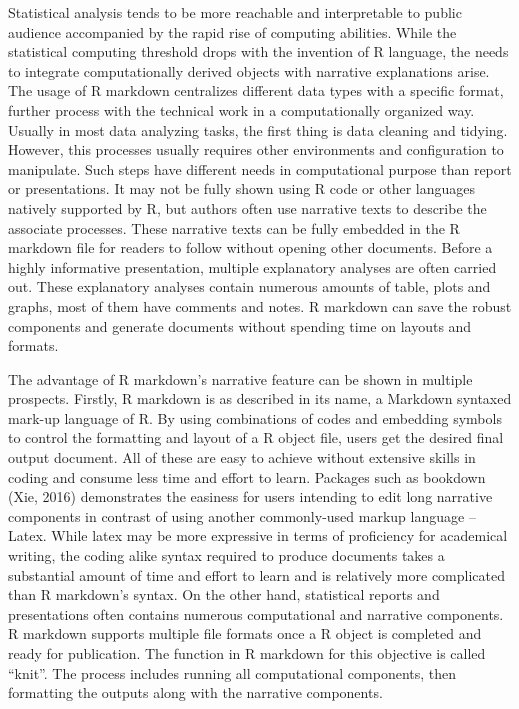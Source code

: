 \documentclass[
]{article}
\begin{document}
Statistical analysis tends to be more reachable and interpretable to
public audience accompanied by the rapid rise of computing abilities.
While the statistical computing threshold drops with the invention of R
language, the needs to integrate computationally derived objects with
narrative explanations arise. The usage of R markdown centralizes
different data types with a specific format, further process with the
technical work in a computationally organized way. Usually in most data
analyzing tasks, the first thing is data cleaning and tidying. However,
this processes usually requires other environments and configuration to
manipulate. Such steps have different needs in computational purpose
than report or presentations. It may not be fully shown using R code or
other languages natively supported by R, but authors often use narrative
texts to describe the associate processes. These narrative texts can be
fully embedded in the R markdown file for readers to follow without
opening other documents. Before a highly informative presentation,
multiple explanatory analyses are often carried out. These explanatory
analyses contain numerous amounts of table, plots and graphs, most of
them have comments and notes. R markdown can save the robust components
and generate documents without spending time on layouts and formats.

The advantage of R markdown's narrative feature can be shown in multiple
prospects. Firstly, R markdown is as described in its name, a Markdown
syntaxed mark-up language of R. By using combinations of codes and
embedding symbols to control the formatting and layout of a R object
file, users get the desired final output document. All of these are easy
to achieve without extensive skills in coding and consume less time and
effort to learn. Packages such as bookdown (Xie, 2016) demonstrates the
easiness for users intending to edit long narrative components in
contrast of using another commonly-used markup language -- Latex. While
latex may be more expressive in terms of proficiency for academical
writing, the coding alike syntax required to produce documents takes a
substantial amount of time and effort to learn and is relatively more
complicated than R markdown's syntax. On the other hand, statistical
reports and presentations often contains numerous computational and
narrative components. R markdown supports multiple file formats once a R
object is completed and ready for publication. The function in R
markdown for this objective is called ``knit''. The process includes
running all computational components, then formatting the outputs along
with the narrative components.
\end{document}
